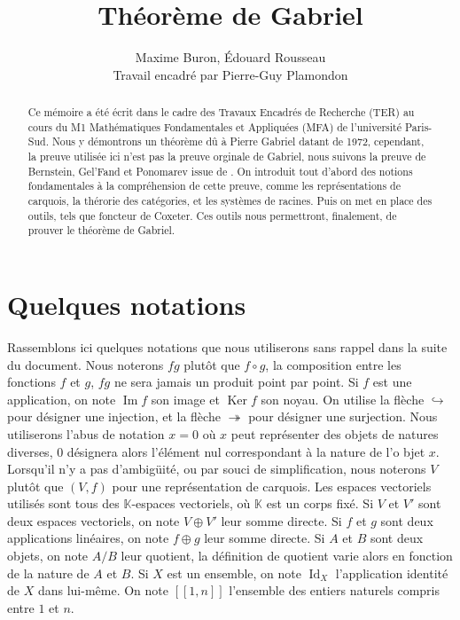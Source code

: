 \documentclass[a4paper,10pt]{article}
\title{Théorème de Gabriel}
\author{Maxime Buron, Édouard Rousseau\\
Travail encadré par Pierre-Guy Plamondon}
\DeclareMathOperator{\Ker}{Ker}
\DeclareMathOperator{\Id}{Id}
\DeclareMathOperator{\Img}{Im}
\begin{document}
\maketitle

\begin{abstract} 
	Ce mémoire a été écrit dans le cadre des Travaux Encadrés de Recherche (TER) au cours du M1 Mathématiques Fondamentales et Appliquées (MFA) de l'université Paris-Sud. Nous y démontrons un théorème dû à Pierre Gabriel datant de 1972, cependant, la preuve utilisée ici n'est pas la preuve orginale de Gabriel, nous suivons la preuve de Bernstein, Gel'Fand et Ponomarev issue de \cite{BGP72}. On introduit tout d'abord des notions fondamentales à la compréhension de cette preuve, comme les représentations de carquois, la thérorie des catégories, et les systèmes de racines. Puis on met en place des outils, tels que foncteur de Coxeter. Ces outils nous permettront, finalement, de prouver le théorème de Gabriel.
\end{abstract}

\tableofcontents

\clearpage
\section*{Quelques notations}
Rassemblons ici quelques notations que nous utiliserons sans rappel dans la suite du document. Nous noterons $fg$ plutôt que $f\circ g$, la composition entre les fonctions $f$ et $g$, $fg$ ne sera jamais un produit point par point. Si $f$ est une application, on note $\Img f$ son image et $\Ker f$ son noyau. On utilise la flèche $\hookrightarrow$ pour désigner une injection, et la flèche $\twoheadrightarrow$ pour désigner une surjection. Nous utiliserons l'abus de notation $x=0$ où $x$ peut représenter des objets de natures diverses, $0$ désignera alors l'élément nul correspondant à la nature de l'o
bjet $x$. Lorsqu'il n'y a pas d'ambigüité, ou par souci de simplification, nous noterons $V$ plutôt que $(V,f)$ pour une représentation de carquois. Les espaces vectoriels utilisés sont tous des $\mathbb K$-espaces vectoriels, où $\mathbb K$ est un corps fixé. Si $V$ et $V'$ sont deux espaces vectoriels, on note $V\oplus V'$ leur somme directe. Si $f$ et $g$ sont deux applications linéaires, on note $f\oplus g$ leur somme directe. Si $A$ et $B$ sont deux objets, on note $A/B$ leur quotient, la définition de quotient varie alors en fonction de la nature de $A$ et $B$. Si $X$ est un ensemble, on note $\Id_X$ l'application identité de $X$ dans lui-même.  On note $[\![1,n]\!]$ l'ensemble des entiers naturels compris entre $1$ et $n$. 
        
\end{document}
